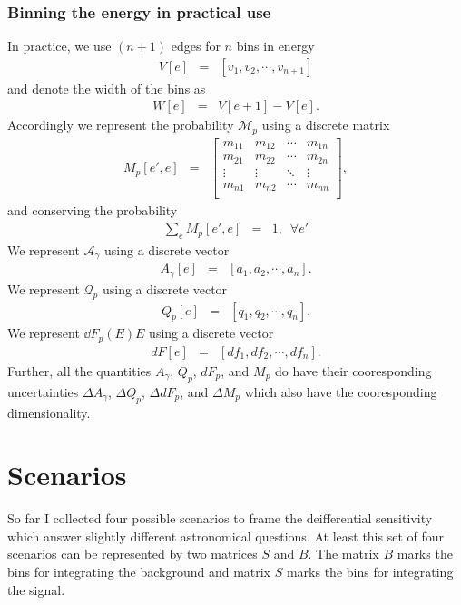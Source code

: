 \documentclass{article}%
\begin{document}
\subsubsection*{Binning the energy in practical use}
%
In practice, we use $(n+1)$ edges for $n$ bins in energy
%
\begin{eqnarray*}
V[e] &=& [v_1, v_2, \cdots, v_{n+1}]
\end{eqnarray*}
%
and denote the width of the bins as
%
\begin{eqnarray*}
W[e] &=& V[e+1] - V[e].
\end{eqnarray*}
%
Accordingly we represent the probability $\mathcal{M}_p$ using a discrete matrix
%
\begin{eqnarray*}
M_p[e', e] &=&
  \left[ {\begin{array}{cccc}
    m_{11} & m_{12} & \cdots & m_{1n}\\
    m_{21} & m_{22} & \cdots & m_{2n}\\
    \vdots & \vdots & \ddots & \vdots\\
    m_{n1} & m_{n2} & \cdots & m_{nn}\\
  \end{array} } \right],
\end{eqnarray*}
%
and conserving the probability
%
\begin{eqnarray*}
\sum_{e} M_p[e', e] &=& 1, \, \, \, \forall e'
\end{eqnarray*}
%
We represent $\mathcal{A}_\gamma$ using a discrete vector
%
\begin{eqnarray*}
A_\gamma[e] &=& [a_1, a_2, \cdots, a_n].
\end{eqnarray*}
%
We represent $\mathcal{Q}_p$ using a discrete vector
%
\begin{eqnarray*}
Q_p[e] &=& [q_1, q_2, \cdots, q_n].
\end{eqnarray*}
%
We represent $\dd{F_p(E)}{E}$ using a discrete vector
%
\begin{eqnarray*}
dF[e] &=& [df_1, df_2, \cdots, df_n].
\end{eqnarray*}
%
Further, all the quantities $A_\gamma$, $Q_p$, $dF_p$, and $M_p$ do have their cooresponding uncertainties $\Delta A_\gamma$, $\Delta Q_p$, $\Delta dF_p$, and $\Delta M_p$ which also have the cooresponding dimensionality.
%
\section{Scenarios}
%
So far I collected four possible scenarios to frame the deifferential sensitivity which answer slightly different astronomical questions.
%
At least this set of four scenarios can be represented by two matrices $S$ and $B$.
%
The matrix $B$ marks the bins for integrating the background and matrix $S$ marks the bins for integrating the signal.
%
\end{document}

